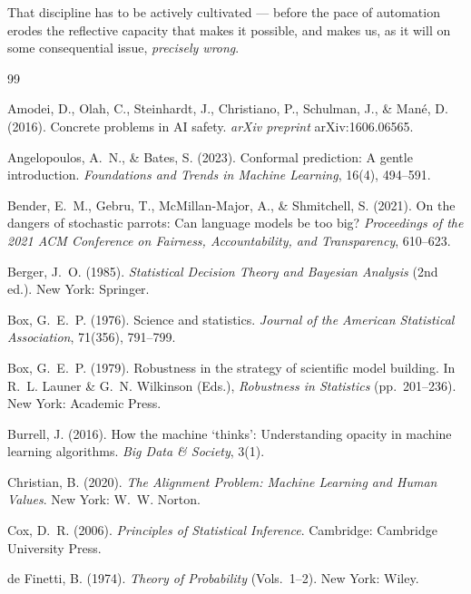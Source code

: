 \documentclass[11pt,a4paper]{article}
\begin{document}
That discipline has to be actively cultivated --- before the pace of
automation erodes the reflective capacity that makes it possible, and
makes us, as it will on some consequential issue, \emph{precisely wrong}.

\begin{thebibliography}{99}
\setlength{\itemsep}{0.1em}

Amodei, D., Olah, C., Steinhardt, J., Christiano, P., Schulman, J., \&
Man\'e, D. (2016). Concrete problems in AI safety. \emph{arXiv preprint}
arXiv:1606.06565.

Angelopoulos, A.~N., \& Bates, S. (2023). Conformal prediction: A
gentle introduction. \emph{Foundations and Trends in Machine Learning},
16(4), 494--591.

Bender, E.~M., Gebru, T., McMillan-Major, A., \& Shmitchell, S. (2021).
On the dangers of stochastic parrots: Can language models be too big?
\emph{Proceedings of the 2021 ACM Conference on Fairness, Accountability,
and Transparency}, 610--623.

Berger, J.~O. (1985). \emph{Statistical Decision Theory and Bayesian
Analysis} (2nd ed.). New York: Springer.

Box, G.~E.~P. (1976). Science and statistics. \emph{Journal of the
American Statistical Association}, 71(356), 791--799.

Box, G.~E.~P. (1979). Robustness in the strategy of scientific model
building. In R.~L. Launer \& G.~N. Wilkinson (Eds.), \emph{Robustness in
Statistics} (pp.~201--236). New York: Academic Press.

Burrell, J. (2016). How the machine `thinks': Understanding opacity in
machine learning algorithms. \emph{Big Data \& Society}, 3(1).

Christian, B. (2020). \emph{The Alignment Problem: Machine Learning and
Human Values}. New York: W.~W. Norton.

Cox, D.~R. (2006). \emph{Principles of Statistical Inference}.
Cambridge: Cambridge University Press.

de Finetti, B. (1974). \emph{Theory of Probability} (Vols.~1--2). New
York: Wiley.


\end{thebibliography}
\end{document}
